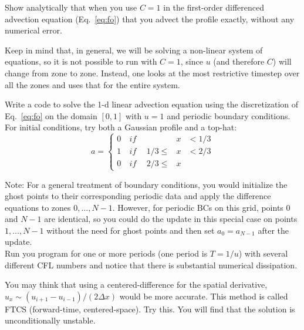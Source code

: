 \begin{exercise}
{Show analytically that when you use $C=1$ in the
  first-order differenced advection equation (Eq.~\ref{eq:fo}) that
  you advect the profile exactly, without any numerical error.}
\end{exercise}

Keep in mind that, in general, we will be solving a non-linear
system of equations, so it is not possible to run with $C=1$, 
since $u$ (and therefore $C$) will change from zone to zone.
Instead, one looks at the most restrictive timestep over all the
zones and uses that for the entire system.


\begin{exercise}
{Write a code to solve the 1-d linear advection equation
  using the discretization of Eq.~\ref{eq:fo} on the domain $[0,1]$ with
  $u=1$ and periodic boundary conditions.  For initial conditions,
  try both a Gaussian profile and a top-hat:}
  \begin{equation}
  a = \left \{
      \begin{array}{lllll}0 & \mathit{~if~~} &         &x& < 1/3 \\
                          1 & \mathit{~if~~} & 1/3 \le &x& < 2/3 \\
                          0 & \mathit{~if~~} & 2/3 \le &x&
      \end{array}
      \right .
  \end{equation}

  \noindent Note: For a general treatment of boundary conditions, you would
    initialize the ghost points to their corresponding periodic data
    and apply the difference equations to zones $0, \ldots, N-1$.
    However, for periodic BCs on this grid, points $0$ and $N-1$ are
    identical, so you could do the update in this special case on
    points $1, \ldots, N-1$ without the need for ghost points and then
    set $a_0 = a_{N-1}$ after the update. \\

  \noindent Run you program for one or more periods (one period
    is $T=1/u$) with several different CFL numbers and notice that
    there is substantial numerical dissipation.
\end{exercise}


\begin{exercise}
{You may think that using a centered-difference for
  the spatial derivative, $u_x \sim (u_{i+1} - u_{i-1})/(2 \Delta x)$
  would be more accurate.  This method is called FTCS (forward-time,
  centered-space).  Try this.  You will find that the solution is
  unconditionally unstable.  }
\end{exercise}

